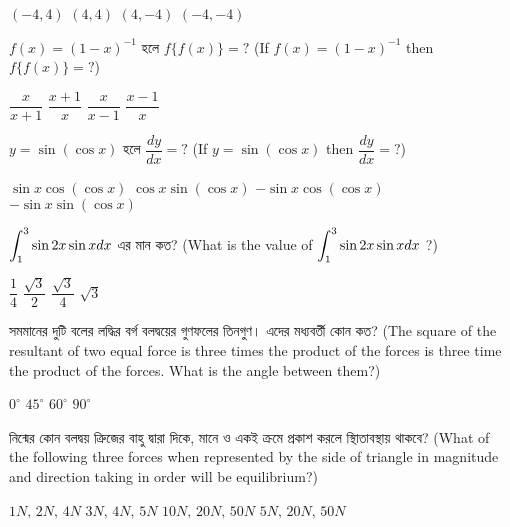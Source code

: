 \documentclass[addpoints]{exam}
\begin{document}
\begin{questions}
\begin{oneparchoices}
\choice $ (-4,4) $
\choice $ (4,4) $
\choice $ (4,-4) $
\choice $ (-4,-4) $
\end{oneparchoices}

\question $ f(x) = (1-x)^{-1} $ হলে $ f\{f(x)\}=?  $ (If $ f(x) = (1-x)^{-1} $ then $ f\{f(x)\}=?  $) 

\begin{oneparchoices}
\choice $ \dfrac{x}{x+1} $
\choice $ \dfrac{x+1}{x} $
\choice $ \dfrac{x}{x-1} $
\choice $ \dfrac{x-1}{x} $
\end{oneparchoices}



\question $ y= \sin (\cos x) $ হলে $ \dfrac{dy}{dx}=?  $ (If $ y= \sin (\cos x) $ then $ \dfrac{dy}{dx}=?  $) 

\begin{oneparchoices}
\choice $ \sin x\cos(\cos x) $
\choice $ \cos x\sin(\cos x) $
\choice $ -\sin x\cos(\cos x) $
\choice $ -\sin x\sin(\cos x) $
\end{oneparchoices}





\question $ \mathlarger{\int_{1}^{3}}\sin 2x\sin x dx $ এর মান কত? (What is the value of $ \mathlarger{\int_{1}^{3}}\sin 2x\sin x dx $ ?)

\begin{oneparchoices}
\choice $ \dfrac{1}{4} $
\choice  $ \dfrac{\sqrt{3}}{2} $
\choice $ \dfrac{\sqrt{3}}{4} $
\choice $ \sqrt{3} $  
\end{oneparchoices}

\question  সমমানের দুটি বলের লদ্ধির বর্গ বলদ্বয়ের গুণফলের তিনগুণ। এদের মধ্যবর্তী কোন কত? (The square of the resultant of two equal force is three times the product of the forces is three time the product of the forces. What is the angle between them?)

\begin{oneparchoices}
\choice $ 0^{\circ} $
\choice $ 45^{\circ} $
\choice $ 60^{\circ} $
\choice $ 90^{\circ} $
\end{oneparchoices}

\question নিন্মের কোন বলদ্বয় ত্রিুজের বাহু দ্বারা দিকে, মানে ও একই ক্রমে প্রকাশ করলে স্থিাতাবস্থায় থাকবে? (What of the following three forces when represented by the side of triangle in magnitude and direction taking in order will be equilibrium?)

\begin{oneparchoices}
\choice $ 1N,\,2N,\,4N $
\choice $ 3N,\,4N,\,5N $
\choice $ 10N,\,20N,\,50N $
\choice $ 5N,\,20N,\,50N $
\end{oneparchoices}


\end{questions}
\end{document}
